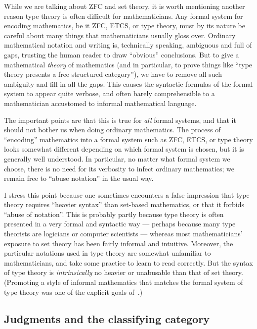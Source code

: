 \documentclass[12pt]{article}
\numberwithin{equation}{section}
\begin{document}
While we are talking about ZFC and set theory, it is worth mentioning another reason type theory is often difficult for mathematicians.
Any formal system for encoding mathematics, be it ZFC, ETCS, or type theory, must by its nature be careful about many things that mathematicians usually gloss over.
Ordinary mathematical notation and writing is, technically speaking, ambiguous and full of gaps, trusting the human reader to draw ``obvious'' conclusions.
But to give a mathematical \emph{theory} of mathematics (and in particular, to prove things like ``type theory presents a free structured category''), we have to remove all such ambiguity and fill in all the gaps.
This causes the syntactic formulas of the formal system to appear quite verbose, and often barely comprehensible to a mathematician accustomed to informal mathematical language.

The important points are that this is true for \emph{all} formal systems, and that it should not bother us when doing ordinary mathematics.
The process of ``encoding'' mathematics into a formal system such as ZFC, ETCS, or type theory looks somewhat different depending on which formal system is chosen, but it is generally well understood.
In particular, no matter what formal system we choose, there is no need for its verbosity to infect ordinary mathematics; we remain free to ``abuse notation'' in the usual way.

I stress this point because one sometimes encounters a false impression that type theory requires ``heavier syntax'' than set-based mathematics, or that it forbids ``abuse of notation''.
This is probably partly because type theory is often presented in a very formal and syntactic way --- perhaps because many type theorists are logicians or computer scientists --- whereas most mathematicians' exposure to set theory has been fairly informal and intuitive.
Moreover, the particular notations used in type theory are somewhat unfamiliar to mathematicians, and take some practice to learn to read correctly.
But the syntax of type theory is \emph{intrinsically} no heavier or unabusable than that of set theory.
(Promoting a style of informal mathematics that matches the formal system of type theory was one of the explicit goals of~\cite{hottbook}.)


\subsection{Judgments and the classifying category}
\label{sec:type-term-judgments}
\end{document}
